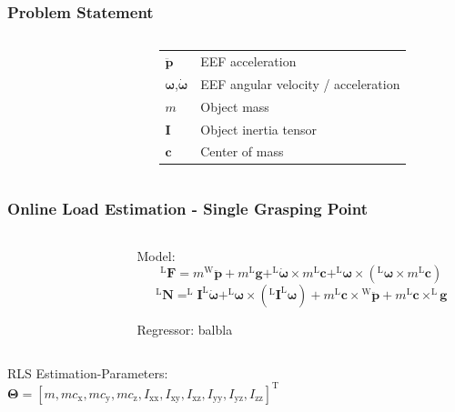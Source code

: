 \documentclass[student,noshadow]{ITRslides}
\renewcommand{\vec}[1]{\boldsymbol{#1}}
\renewcommand{\vec}[1]{\boldsymbol{#1}}
\newcommand{\scr}[1]{\mathrm{#1}}
\begin{document}
\begin{frame}
	\frametitle{Problem Statement}
	
	\begin{columns}
		\centering
		\begin{column}{0.25\textwidth}
			\begin{figure}
				\centering
				
			\end{figure}
		\end{column}
				 		
		\begin{column}{0.75\textwidth}
			\begin{tabular}{ll}
				\toprule
				$\vec{\ddot{p}}$       &  EEF acceleration \\
				$\vec{\omega}$,$\vec{\dot{\omega}}$ & EEF angular velocity / acceleration \\
				\color{red}$m$                                        & Object mass \\
				\color{red}$\vec{I}$                        & Object inertia tensor \\
				\color{red}$\vec{c}$                             &  Center of mass   \\               
				\bottomrule
			\end{tabular}
		\end{column}
	\end{columns}
\end{frame}

\begin{frame}
	\frametitle{Online Load Estimation - Single Grasping Point}
	
	\begin{columns}
		\centering
		\begin{column}{0.25\textwidth}
			\begin{figure}
				\centering
				
			\end{figure}
		\end{column}
				 		
		\begin{column}{0.75\textwidth}
			Model:\\ \cite{literaturstelle2}
			\[^\scr{L}\vec{F} = m {^\scr{W}}\vec{\ddot{p}} + m ^\scr{L}\vec{g} + ^\scr{L}\vec{\dot{\omega}} \times m ^\scr{L}\vec{c} + ^\scr{L}\vec{\omega} \times (^\scr{L}\vec{\omega} \times m ^\scr{L}\vec{c})\]
			\[^\scr{L}\vec{N} = ^\scr{L}\vec{I} ^\scr{L}\vec{\dot{\omega}} + ^\scr{L}\vec{\omega} \times (^\scr{L}\vec{I} ^\scr{L}\vec{\omega}) + m ^\scr{L}\vec{c} \times {^\scr{W}}\vec{\ddot{p}} + m ^\scr{L}\vec{c} \times ^\scr{L}\vec{g}\]
						
			\vspace{0.2cm}
			Regressor:
			balbla
		\end{column}
	\end{columns}
	\vspace{0.35cm}
	RLS Estimation-Parameters: \\
	$\vec{\Theta} = [m, m c_\scr{x}, m c_\scr{y}, m c_\scr{z}, I_\scr{xx}, I_\scr{xy}, I_\scr{xz}, I_\scr{yy},I_\scr{yz}, I_\scr{zz}]^\scr{T}$ \\
\end{frame}
\end{document}
